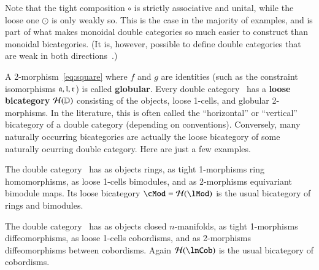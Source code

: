 Note that the tight composition $\circ$ is strictly associative and
unital, while the loose one $\odot$ is only weakly so.  This is
the case in the majority of examples, and is part of what makes monoidal double categories so much easier to construct than monoidal bicategories.
(It is, however, possible to define double categories that are weak in both directions~\cite{verity:base-change}.)



A 2-morphism~\eqref{eq:square} where $f$ and $g$ are identities (such
as the constraint isomorphisms $\mathfrak{a},\mathfrak{l},\mathfrak{r}$) is called
\textbf{globular}.  Every double category \lD\ has a
\textbf{loose bicategory} $\mathcal{H}(\mathbb{D})$ consisting of the objects,
loose 1-cells, and globular 2-morphisms.  In the literature, this is often called the ``horizontal'' or ``vertical'' bicategory of a double category (depending on conventions). Conversely, many naturally
occurring bicategories are actually the loose bicategory of some
naturally ocurring double category.  Here are just a few examples.

\begin{eg}
  The double category \lMod\ has as objects rings, as tight 1-morphisms ring
  homomorphisms, as loose 1-cells bimodules, and as 2-morphisms equivariant
  bimodule maps.  Its loose bicategory $\cMod = \cH(\lMod)$ is
  the usual bicategory of rings and bimodules.%
\end{eg}

\begin{eg}
  The double category \lnCob\ has as objects closed $n$-manifolds, as
  tight 1-morphisms diffeomorphisms, as loose 1-cells cobordisms, and as
  2-morphisms diffeomorphisms between cobordisms.  Again $\cH(\lnCob)$
  is the usual bicategory of cobordisms.
\end{eg}

